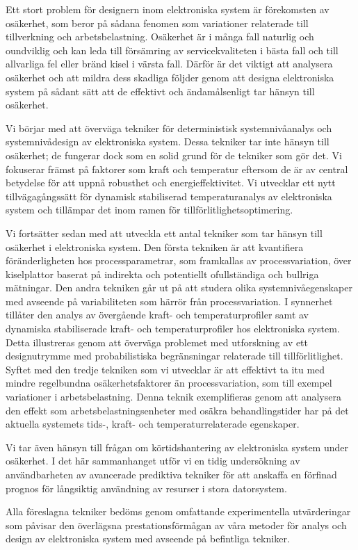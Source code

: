 Ett stort problem för designern inom elektroniska system är förekomsten av
osäkerhet, som beror på sådana fenomen som variationer relaterade till
tillverkning och arbetsbelastning. Osäkerhet är i många fall naturlig och
oundviklig och kan leda till försämring av servicekvaliteten i bästa fall och
till allvarliga fel eller bränd kisel i värsta fall. Därför är det viktigt att
analysera osäkerhet och att mildra dess skadliga följder genom att designa
elektroniska system på sådant sätt att de effektivt och ändamålsenligt tar
hänsyn till osäkerhet.

Vi börjar med att överväga tekniker för deterministisk systemnivåanalys och
systemnivådesign av elektroniska system. Dessa tekniker tar inte hänsyn till
osäkerhet; de fungerar dock som en solid grund för de tekniker som gör det. Vi
fokuserar främst på faktorer som kraft och temperatur eftersom de är av central
betydelse för att uppnå robusthet och energieffektivitet. Vi utvecklar ett nytt
tillvägagångssätt för dynamisk stabiliserad temperaturanalys av elektroniska
system och tillämpar det inom ramen för tillförlitlighetsoptimering.

Vi fortsätter sedan med att utveckla ett antal tekniker som tar hänsyn till
osäkerhet i elektroniska system. Den första tekniken är att kvantifiera
föränderligheten hos processparametrar, som framkallas av processvariation, över
kiselplattor baserat på indirekta och potentiellt ofullständiga och bullriga
mätningar. Den andra tekniken går ut på att studera olika systemnivåegenskaper
med avseende på variabiliteten som härrör från processvariation. I synnerhet
tillåter den analys av övergående kraft- och temperaturprofiler samt av
dynamiska stabiliserade kraft- och temperaturprofiler hos elektroniska system.
Detta illustreras genom att överväga problemet med utforskning av ett
designutrymme med probabilistiska begränsningar relaterade till
tillförlitlighet. Syftet med den tredje tekniken som vi utvecklar är att
effektivt ta itu med mindre regelbundna osäkerhetsfaktorer än processvariation,
som till exempel variationer i arbetsbelastning. Denna teknik exemplifieras
genom att analysera den effekt som arbetsbelastningsenheter med osäkra
behandlingstider har på det aktuella systemets tids-, kraft- och
temperaturrelaterade egenskaper.

Vi tar även hänsyn till frågan om körtidshantering av elektroniska system under
osäkerhet. I det här sammanhanget utför vi en tidig undersökning av
användbarheten av avancerade prediktiva tekniker för att anskaffa en förfinad
prognos för långsiktig användning av resurser i stora datorsystem.

Alla föreslagna tekniker bedöms genom omfattande experimentella utvärderingar
som påvisar den överlägsna prestationsförmågan av våra metoder för analys och
design av elektroniska system med avseende på befintliga tekniker.

